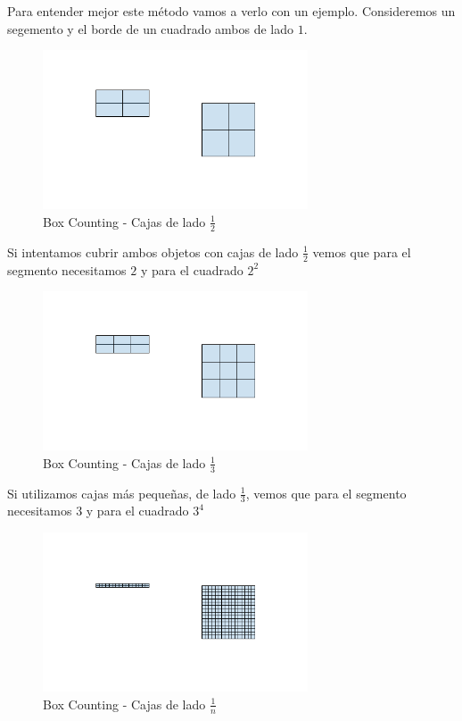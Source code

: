 \noindent Para entender mejor este método vamos a verlo con un ejemplo. Consideremos un segemento y el borde de un cuadrado ambos de lado $1$. \cite{youtube-2022}

\begin{figure}[H]
    \centering
    \includegraphics[width=0.7\textwidth]{figures/boxcounting-1.png}
    \caption{Box Counting - Cajas de lado $\frac{1}{2}$}
\end{figure}

\noindent Si intentamos cubrir ambos objetos con cajas de lado $\frac{1}{2}$ vemos que para el segmento necesitamos $2$ y para el cuadrado $2^2$

\begin{figure}[H]
    \centering
    \includegraphics[width=0.7\textwidth]{figures/boxcounting-2.png}
    \caption{Box Counting - Cajas de lado $\frac{1}{3}$}
\end{figure}

\noindent Si utilizamos cajas más pequeñas, de lado $\frac{1}{3}$, vemos que para el segmento necesitamos $3$ y para el cuadrado $3^4$

\begin{figure}[H]
    \centering
    \includegraphics[width=0.7\textwidth]{figures/boxcounting-3.png}
    \caption{Box Counting - Cajas de lado $\frac{1}{n}$}
\end{figure}

